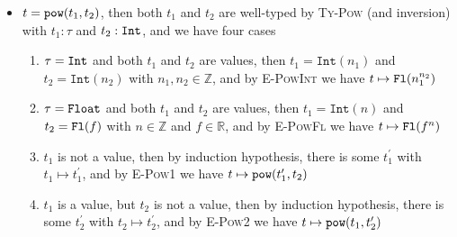 \documentclass{article}
\newcommand{\fl}[1]{\ensuremath\mathtt{Fl}(#1)}
\newcommand{\nat}[1]{\ensuremath{\mathtt{Int}(#1)}}
\newcommand{\tofloat}[1]{\ensuremath\mathtt{AsFloat}(#1)}
\newcommand{\tyint}{\ensuremath\mathtt{Int}}
\newcommand{\tyfloat}{\ensuremath\mathtt{Float}}
\newcommand{\pow}[2]{\ensuremath\mathtt{pow}(#1,#2)}
\begin{document}
\begin{itemize}
\begin{enumerate}
\item $t^{\prime}$ is a value, then (by inversion), $t^{\prime} = \nat{n}$ for some $n\in\mathbb{Z}$ and we have $t\mapsto \fl{n}$
\item $t^{\prime}$ is not a value, then by induction hypothesis, there exists some $t^{\prime\prime}$ such that $t^{\prime} \mapsto t^{\prime\prime}$. Then by \textsc{E-AsFloat}, we have $t\mapsto \tofloat{t^{\prime\prime}}$
\end{enumerate}
\item $t = \pow{t_1}{t_2}$, then both $t_1$ and $t_2$ are well-typed by \textsc{Ty-Pow} (and inversion) with $t_1:\tau$ and $t_2:\tyint$, and we have four cases 
\begin{enumerate}
\item $\tau=\tyint$ and both $t_1$ and $t_2$ are values, then $t_1=\nat{n_1}$ and $t_2=\nat{n_2}$ with $n_1,n_2\in\mathbb{Z}$, and by \textsc{E-PowInt} we have $t\mapsto \fl{n_1^{n_2}}$
\item $\tau=\tyfloat$ and both $t_1$ and $t_2$ are values, then $t_1 = \nat{n}$ and $t_2=\fl{f}$ with $n\in\mathbb{Z}$ and $f\in\mathbb{R}$, and by \textsc{E-PowFl} we have $t\mapsto \fl{f^n}$
\item $t_1$ is not a value, then by induction hypothesis, there is some $t_1^{\prime}$ with $t_1\mapsto t_1^{\prime}$, and by \textsc{E-Pow1} we have $t\mapsto \pow{t_1^{\prime}}{t_2}$
\item $t_1$ is a value, but $t_2$ is not a value, then by induction hypothesis, there is some $t_2^{\prime}$ with $t_2\mapsto t_2^{\prime}$, and by \textsc{E-Pow2} we have $t\mapsto \pow{t_1}{t_2^{\prime}}$
\end{enumerate}
\end{itemize}
\end{document}

